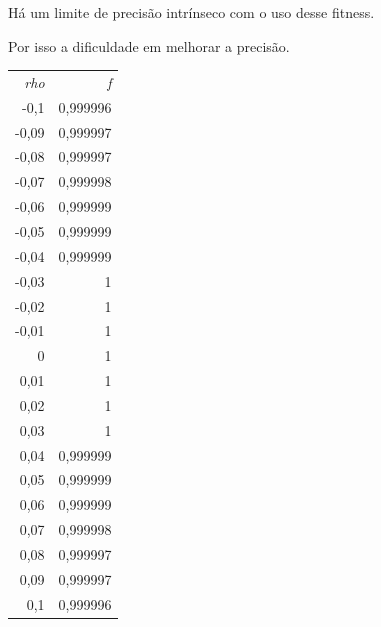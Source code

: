 	Há um limite de precisão intrínseco com o uso desse fitness.
	
	Por isso a dificuldade em melhorar a precisão.
	
\begin{tabular}{rr}

       \textit{rho} &          \textit{f} \\

      -0,1 &   0,999996 \\

     -0,09 &   0,999997 \\

     -0,08 &   0,999997 \\

     -0,07 &   0,999998 \\

     -0,06 &   0,999999 \\

     -0,05 &   0,999999 \\

     -0,04 &   0,999999 \\

     -0,03 &          1 \\

     -0,02 &          1 \\

     -0,01 &          1 \\

         0 &          1 \\

      0,01 &          1 \\

      0,02 &          1 \\

      0,03 &          1 \\

      0,04 &   0,999999 \\

      0,05 &   0,999999 \\

      0,06 &   0,999999 \\

      0,07 &   0,999998 \\

      0,08 &   0,999997 \\

      0,09 &   0,999997 \\

       0,1 &   0,999996 \\

\end{tabular}  

